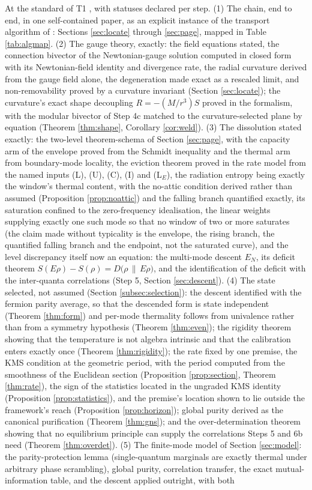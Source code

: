 \documentclass[11pt]{article}
\theoremstyle{definition}
\newcommand{\EN}{E_{N}}
\newcommand{\rel}[2]{D\bigl(#1 \,\|\, #2\bigr)}
\begin{document}
At the standard of T1 \cite{ButlerT1}, with statuses declared per step.
(1) The chain, end to end, in one self-contained paper, as an explicit instance of the transport algorithm of \cite[\S 8.1]{ButlerT1}: Sections \ref{sec:locate} through \ref{sec:page}, mapped in Table \ref{tab:algmap}. (2) The gauge theory, exactly: the field equations stated, the connection bivector of the Newtonian-gauge solution computed in closed form with its Newtonian-field identity and divergence rate, the radial curvature derived from the gauge field alone, the degeneration made exact as a rescaled limit, and non-removability proved by a curvature invariant (Section \ref{sec:locate}); the curvature's exact shape decoupling $R = -(M/r^3)S$ proved in the formalism, with the modular bivector of Step 4c matched to the curvature-selected plane by equation (Theorem \ref{thm:shape}, Corollary \ref{cor:weld}). (3) The dissolution stated exactly: the two-level theorem-schema of Section \ref{sec:page}, with the capacity arm of the envelope proved from the Schmidt inequality and the thermal arm from boundary-mode locality, the eviction theorem proved in the rate model from the named inputs (L), (U), (C), (I) and (L$_E$), the radiation entropy being exactly the window's thermal content, with the no-attic condition derived rather than assumed (Proposition \ref{prop:noattic}) and the falling branch quantified exactly, its saturation confined to the zero-frequency idealisation, the linear weights supplying exactly one such mode so that no window of two or more saturates (the claim made without typicality is the envelope, the rising branch, the quantified falling branch and the endpoint, not the saturated curve), and the level discrepancy itself now an equation: the multi-mode descent $\EN$, its deficit theorem $S(E\rho) - S(\rho) = \rel{\rho}{E\rho}$, and the identification of the deficit with the inter-quanta correlations (Step 5, Section \ref{sec:descent}). (4) The state selected, not assumed (Section \ref{subsec:selection}): the descent identified with the fermion parity average, so that the descended form is state independent (Theorem \ref{thm:form}) and per-mode thermality follows from univalence rather than from a symmetry hypothesis (Theorem \ref{thm:even}); the rigidity theorem showing that the temperature is not algebra intrinsic and that the calibration enters exactly once (Theorem \ref{thm:rigidity}); the rate fixed by one premise, the KMS condition at the geometric period, with the period computed from the smoothness of the Euclidean section (Proposition \ref{prop:section}, Theorem \ref{thm:rate}), the sign of the statistics located in the ungraded KMS identity (Proposition \ref{prop:statistics}), and the premise's location shown to lie outside the framework's reach (Proposition \ref{prop:horizon}); global purity derived as the canonical purification (Theorem \ref{thm:gns}); and the over-determination theorem showing that no equilibrium principle can supply the correlations Steps 5 and 6b need (Theorem \ref{thm:overdet}). (5) The finite-mode model of Section \ref{sec:model}: the parity-protection lemma (single-quantum marginals are exactly thermal under arbitrary phase scrambling), global purity, correlation transfer, the exact mutual-information table, and the descent applied outright, with both 
\end{document}
